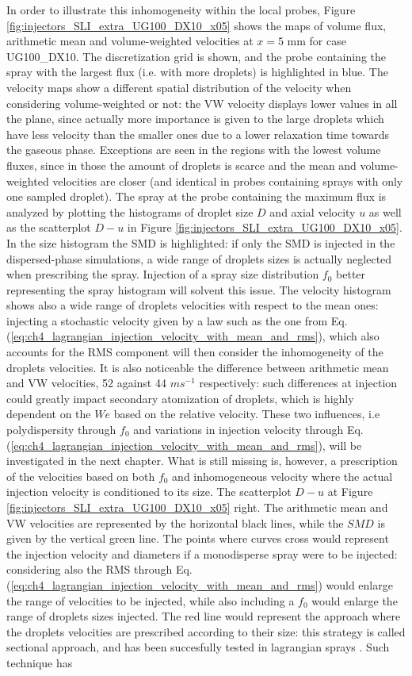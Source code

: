 In order to illustrate this inhomogeneity within the local probes, Figure \ref{fig:injectors_SLI_extra_UG100_DX10_x05} shows the maps of volume flux, arithmetic mean and volume-weighted velocities at $x = 5$ mm for case UG100\_DX10. The discretization grid is shown, and the probe containing the spray with the largest flux (i.e. with more droplets) is highlighted in blue. The velocity maps show a different spatial distribution of the velocity when considering volume-weighted or not: the VW velocity displays lower values in all the plane, since actually more importance is given to the large droplets which have less velocity than the smaller ones due to a lower relaxation time towards the gaseous phase. Exceptions are seen in the regions with the lowest volume fluxes, since in those the amount of droplets is scarce and the mean and volume-weighted velocities are closer (and identical in probes containing sprays with only one sampled droplet). The spray at the probe containing the maximum flux is analyzed by plotting the histograms of droplet size $D$ and axial velocity $u$ as well as the scatterplot $D - u$ in Figure \ref{fig:injectors_SLI_extra_UG100_DX10_x05}. In the size histogram the SMD is highlighted: if only the SMD is injected in the dispersed-phase simulations, a wide range of droplets sizes is actually neglected when prescribing the spray. Injection of a spray size distribution $f_0$ better representing the spray histogram will solvent this issue. The velocity histogram shows also a wide range of droplets velocities with respect to the mean ones: injecting a stochastic velocity given by a law such as the one from Eq. (\ref{eq:ch4_lagrangian_injection_velocity_with_mean_and_rms}), which also accounts for the RMS component will then consider the inhomogeneity of the droplets velocities. It is also noticeable the difference between arithmetic mean and VW velocities, 52 against 44 $m s^{-1}$ respectively: such differences at injection could greatly impact secondary atomization of droplets, which is highly dependent on the $We$ based on the relative velocity. These two influences, i.e polydispersity through $f_0$ and variations in injection velocity through Eq. (\ref{eq:ch4_lagrangian_injection_velocity_with_mean_and_rms}), will be investigated in the next chapter. What is still missing is, however, a prescription of the velocities based on both $f_0$ and inhomogeneous velocity where the actual injection velocity is conditioned to its size. The scatterplot $D-u$ at Figure \ref{fig:injectors_SLI_extra_UG100_DX10_x05} right. The arithmetic mean and VW velocities are represented by the horizontal black lines, while the $SMD$ is given by the vertical green line. The points where curves cross would represent the injection velocity and diameters if a monodisperse spray were to be injected: considering also the RMS through Eq. (\ref{eq:ch4_lagrangian_injection_velocity_with_mean_and_rms}) would enlarge the range of velocities to be injected, while also including a $f_0$ would enlarge the range of droplets sizes injected. The red line would represent the approach where the droplets velocities are prescribed according to their size: this strategy is called sectional approach, and has been succesfully tested in lagrangian sprays . Such technique has 